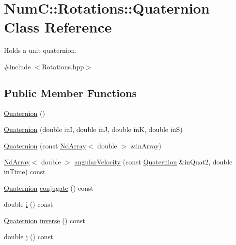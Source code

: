 \hypertarget{class_num_c_1_1_rotations_1_1_quaternion}{}\section{NumC\+:\+:Rotations\+:\+:Quaternion Class Reference}
\label{class_num_c_1_1_rotations_1_1_quaternion}


Holds a unit quaternion.  




{\ttfamily \#include $<$Rotations.\+hpp$>$}

\subsection*{Public Member Functions}
\begin{DoxyCompactItemize}
\item 
\mbox{\hyperlink{class_num_c_1_1_rotations_1_1_quaternion_a652640bb697d5c3b79d33dfd8be23551}{Quaternion}} ()
\item 
\mbox{\hyperlink{class_num_c_1_1_rotations_1_1_quaternion_aaa90858cd72f7c46522f3579550b36aa}{Quaternion}} (double inI, double inJ, double inK, double inS)
\item 
\mbox{\hyperlink{class_num_c_1_1_rotations_1_1_quaternion_a7bb863ac261c44e2f2cfbd610bb5c787}{Quaternion}} (const \mbox{\hyperlink{class_num_c_1_1_nd_array}{Nd\+Array}}$<$ double $>$ \&in\+Array)
\item 
\mbox{\hyperlink{class_num_c_1_1_nd_array}{Nd\+Array}}$<$ double $>$ \mbox{\hyperlink{class_num_c_1_1_rotations_1_1_quaternion_aa92a1e1367dff9d75505de8d25d2657d}{angular\+Velocity}} (const \mbox{\hyperlink{class_num_c_1_1_rotations_1_1_quaternion}{Quaternion}} \&in\+Quat2, double in\+Time) const
\item 
\mbox{\hyperlink{class_num_c_1_1_rotations_1_1_quaternion}{Quaternion}} \mbox{\hyperlink{class_num_c_1_1_rotations_1_1_quaternion_a23ff5925a91c1131a78935f8628edaed}{conjugate}} () const
\item 
double \mbox{\hyperlink{class_num_c_1_1_rotations_1_1_quaternion_aec704993b1650cb91b50090d0f0822a4}{i}} () const
\item 
\mbox{\hyperlink{class_num_c_1_1_rotations_1_1_quaternion}{Quaternion}} \mbox{\hyperlink{class_num_c_1_1_rotations_1_1_quaternion_a465bcbcab268a0926685c07d08ff0922}{inverse}} () const
\item 
double \mbox{\hyperlink{class_num_c_1_1_rotations_1_1_quaternion_a68559bf006214eac52a53fe3ee146175}{j}} () const

\end{DoxyCompactItemize}
